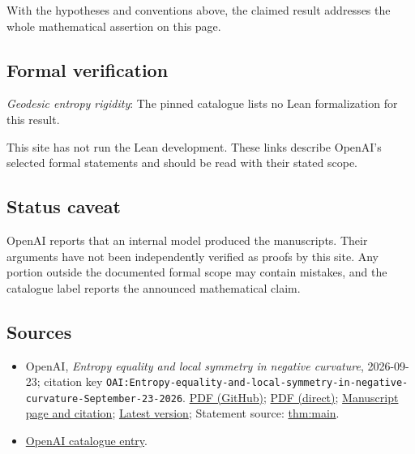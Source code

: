 \documentclass[11pt]{article}
\begin{document}
With the hypotheses and conventions above, the claimed result addresses the whole mathematical assertion on this page.

\subsection{Formal verification}
\textit{Geodesic entropy rigidity}: The pinned catalogue lists no Lean formalization for this result.

This site has not run the Lean development. These links describe OpenAI’s selected formal statements and should be read with their stated scope.

\subsection{Status caveat}
OpenAI reports that an internal model produced the manuscripts. Their arguments have not been independently verified as proofs by this site. Any portion outside the documented formal scope may contain mistakes, and the catalogue label reports the announced mathematical claim.

\subsection{Sources}
\begin{itemize}
\item OpenAI, \emph{Entropy equality and local symmetry in negative curvature}, 2026-09-23; citation key \texttt{OAI:Entropy-equality-and-local-symmetry-in-negative-curvature-September-23-2026}. \href{https://github.com/openai/math/blob/adc7f1241b42e322a6451854ab7e4b4c146bf78a/preprints/Entropy-equality-and-local-symmetry-in-negative-curvature-September-23-2026/paper.pdf}{PDF (GitHub)}; \href{https://github.com/openai/math/raw/adc7f1241b42e322a6451854ab7e4b4c146bf78a/preprints/Entropy-equality-and-local-symmetry-in-negative-curvature-September-23-2026/paper.pdf}{PDF (direct)}; \href{https://github.com/openai/math/blob/adc7f1241b42e322a6451854ab7e4b4c146bf78a/preprints/Entropy-equality-and-local-symmetry-in-negative-curvature-September-23-2026/README.md}{Manuscript page and citation}; \href{https://github.com/openai/math/blob/main/preprints/Entropy-equality-and-local-symmetry-in-negative-curvature-September-23-2026/paper.pdf}{Latest version}; Statement source: \href{https://github.com/openai/math/blob/adc7f1241b42e322a6451854ab7e4b4c146bf78a/preprints/Entropy-equality-and-local-symmetry-in-negative-curvature-September-23-2026/build/main.tex\#L89}{thm:main}.
\item \href{https://github.com/openai/math/blob/adc7f1241b42e322a6451854ab7e4b4c146bf78a/CONTENTS.md}{OpenAI catalogue entry}.
\end{itemize}
\end{document}
